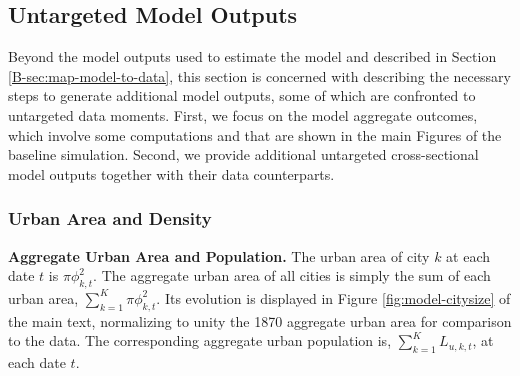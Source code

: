 \documentclass[11pt]{report}
\newcommand{\blueie}[1]{\textcolor[rgb]{0.1,0.0,0.95}{#1}}
\begin{document}
\newpage
\subsection{Untargeted Model Outputs}\label{B-sec:model-outputs}

Beyond the model outputs used to estimate the model and described in Section \ref{B-sec:map-model-to-data}, this section is concerned with describing the necessary steps to generate additional model outputs, some of which are confronted to untargeted data moments. First, we focus on the model aggregate outcomes, which involve some computations and that are shown in the main Figures of the baseline simulation. Second, we provide additional untargeted cross-sectional model outputs together with their data counterparts. %




\subsubsection{Urban Area and Density}\label{B-sec:urban-area-density}

\textbf{Aggregate Urban Area and Population.} The urban area of city $k$ at each date $t$ is $\pi \phi_{k,t}^2$. The aggregate urban area of all cities is simply the sum of each urban area, $\sum_{k=1}^K \pi \phi_{k,t}^2$. Its evolution is displayed in Figure \ref{fig:model-citysize} of the main text, normalizing to unity the 1870 aggregate urban area for comparison to the data. The corresponding aggregate urban population is,  $\sum_{k=1}^K L_{u,k,t}$, at each date $t$.
\end{document}
